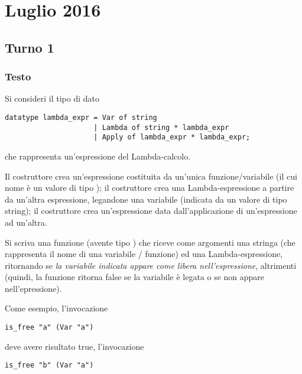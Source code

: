 \section{Luglio 2016}

\subsection{Turno 1}

\subsubsection{Testo}

Si consideri il tipo di dato

\begin{lstlisting}[style = SML, caption = {Definizione del tipo di dato \sml{espressione Lambda}}]
datatype lambda_expr = Var of string
					 | Lambda of string * lambda_expr
					 | Apply of lambda_expr * lambda_expr;
\end{lstlisting}

che rappresenta un'espressione del Lambda-calcolo.

\medskip
Il costruttore  crea un'espressione costituita da un'unica funzione/variabile (il cui nome è un valore di tipo );
il costruttore  crea una Lambda-espressione a partire da un'altra espressione, legandone una variabile (indicata da un valore di tipo string);
il costruttore  crea un'espressione data dall'applicazione di un'espressione ad un'altra.

\medskip
Si scriva una funzione  (avente tipo ) che riceve come argomenti una stringa (che rappresenta il nome di una variabile / funzione) ed una Lambda-espressione, %
ritornando  se \emph{la variabile indicata appare come libera nell'espressione}, %
 altrimenti (quindi, la funzione ritorna false se la variabile è legata o se non appare nell'epressione).

\medskip
Come esempio, l'invocazione

\begin{lstlisting}[style = SML]
is_free "a" (Var "a")
\end{lstlisting}

deve avere risultato true, l'invocazione

\begin{lstlisting}[style = SML]
is_free "b" (Var "a")
\end{lstlisting}

